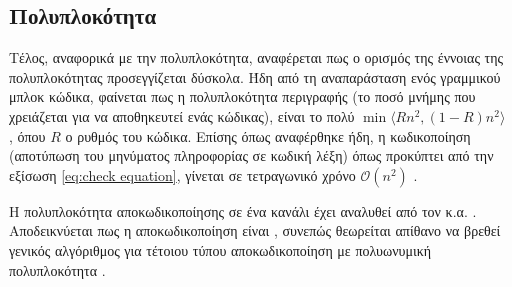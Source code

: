 \subsection{Πολυπλοκότητα}

Τέλος, αναφορικά με την πολυπλοκότητα, αναφέρεται πως ο ορισμός της έννοιας της πολυπλοκότητας προσεγγίζεται δύσκολα. Ήδη από τη αναπαράσταση ενός γραμμικού μπλοκ κώδικα, φαίνεται πως η πολυπλοκότητα περιγραφής (το ποσό μνήμης που χρειάζεται για να αποθηκευτεί ενάς κώδικας), είναι το πολύ $\min\langle Rn^2, \left(1-R\right)n^2\rangle$ , όπου $R$ ο ρυθμός του κώδικα. Επίσης όπως αναφέρθηκε ήδη, η κωδικοποίηση (αποτύπωση του μηνύματος πληροφορίας σε κωδική λέξη) όπως προκύπτει από την εξίσωση \ref{eq:check equation}, γίνεται σε τετραγωνικό χρόνο $\mathcal{O}(n^2)$ \cite{richardson2008modern}.

Η πολυπλοκότητα αποκωδικοποίησης  σε ένα κανάλι  έχει αναλυθεί από τον  κ.α. \cite{berlekamp1978inherent}. Αποδεικνύεται πως η  αποκωδικοποίηση είναι , συνεπώς θεωρείται απίθανο να βρεθεί γενικός αλγόριθμος για τέτοιου τύπου αποκωδικοποίηση με πολυωνυμική πολυπλοκότητα \cite{bruck1990hardness}.
